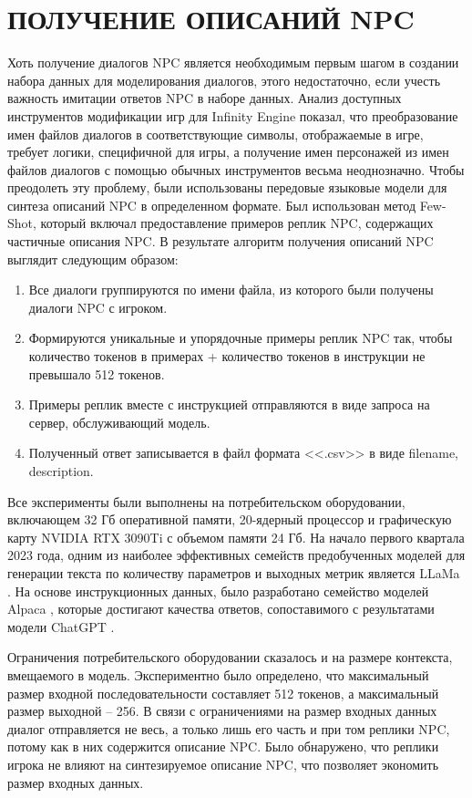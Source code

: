 \section{ПОЛУЧЕНИЕ ОПИСАНИЙ NPC}

Хоть получение диалогов NPC является необходимым первым шагом в создании набора данных для моделирования диалогов, этого недостаточно, если учесть важность имитации ответов NPC в наборе данных. Анализ доступных инструментов модификации игр для Infinity Engine показал, что преобразование имен файлов диалогов в соответствующие символы, отображаемые в игре, требует логики, специфичной для игры, а получение имен персонажей из имен файлов диалогов с помощью обычных инструментов весьма неоднозначно. Чтобы преодолеть эту проблему, были использованы передовые языковые модели для синтеза описаний NPC в определенном формате. Был использован метод Few-Shot, который включал предоставление примеров реплик NPC, содержащих частичные описания NPC. В результате алгоритм получения описаний NPC выглядит следующим образом:
\begin{enumerate}
  \item Все диалоги группируются по имени файла, из которого были получены диалоги NPC с игроком.
  \item Формируются уникальные и упорядочные примеры реплик NPC так, чтобы количество токенов в примерах + количество токенов в инструкции не превышало 512 токенов.
  \item Примеры реплик вместе с инструкцией отправляются в виде запроса на сервер, обслуживающий модель.
  \item Полученный ответ записывается в файл формата <<.csv>> в виде filename, description.
\end{enumerate}

Все эксперименты были выполнены на потребительском оборудовании, включающем 32 Гб оперативной памяти, 20-ядерный процессор и графическую карту NVIDIA RTX 3090Ti с объемом памяти 24 Гб. На начало первого квартала 2023 года, одним из наиболее эффективных семейств предобученных моделей для генерации текста по количеству параметров и выходных метрик является LLaMa \cite{llama-paper}. На основе инструкционных данных, было разработано семейство моделей Alpaca \cite{alpaca-docs}, которые достигают качества ответов, сопоставимого с результатами модели ChatGPT \cite{chatgpt-docs}.

Ограничения потребительского оборудовании сказалось и на размере контекста, вмещаемого в модель. Экспериментно было определено, что максимальный размер входной последовательности составляет 512 токенов, а максимальный размер выходной -- 256. В связи с ограничениями на размер входных данных диалог отправляется не весь, а только лишь его часть и при том реплики NPC, потому как в них содержится описание NPC. Было обнаружено, что реплики игрока не влияют на синтезируемое описание NPC, что позволяет экономить размер входных данных. 

